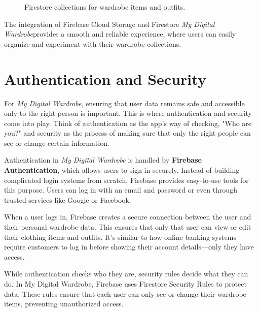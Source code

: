 \begin{figure}[!ht]\centering
    \qquad %
    \caption{Firestore collections for wardrobe items and outfits.}
    \label{fig:firestore_collections}
\end{figure}


The integration of Firebase Cloud Storage and Firestore \textit{My Digital Wardrobe}provides a smooth and reliable experience, where users can easily organize and experiment with their wardrobe collections.

\section{Authentication and Security}

For \textit{My Digital Wardrobe}, ensuring that user data remains safe and accessible only to the right person is important. This is where authentication and security come into play. Think of authentication as the app's way of checking, "Who are you?" and security as the process of making sure that only the right people can see or change certain information.

Authentication in \textit{My Digital Wardrobe} is handled by \textbf{Firebase Authentication}, which allows users to sign in securely. Instead of building complicated login systems from scratch, Firebase provides easy-to-use tools for this purpose. Users can log in with an email and password or even through trusted services like Google or Facebook.

When a user logs in, Firebase creates a secure connection between the user and their personal wardrobe data. This ensures that only that user can view or edit their clothing items and outfits. It’s similar to how online banking systems require customers to log in before showing their account details—only they have access.


While authentication checks who they are, security rules decide what they can do. In My Digital Wardrobe, Firebase uses Firestore Security Rules to protect data. These rules ensure that each user can only see or change their wardrobe items, preventing unauthorized access.

